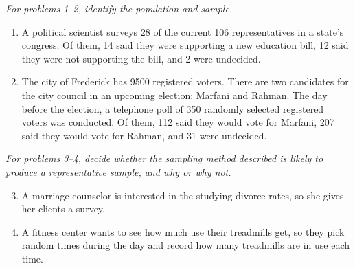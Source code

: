 \emph{For problems 1--2, identify the population and sample.}
\begin{enumerate}
\item A political scientist surveys 28 of the current 106 representatives in a state's congress. Of them, 14 said they were supporting a new education bill, 12 said they were not supporting the bill, and 2 were undecided. 

\item The city of Frederick has 9500 registered voters. There are two candidates for the city council in an upcoming election: Marfani and Rahman. The day before the election, a telephone poll of 350 randomly selected registered voters was conducted. Of them, 112 said they would vote for Marfani, 207 said they would vote for Rahman, and 31 were undecided. 
\end{enumerate} 

\emph{For problems 3--4, decide whether the sampling method described is likely to produce a representative sample, and why or why not.}
\begin{enumerate}
\setcounter{enumi}{2}
\item A marriage counselor is interested in the studying divorce rates, so she gives her clients a survey. 

\item A fitness center wants to see how much use their treadmills get, so they pick random times during the day and record how many treadmills are in use each time. 
\end{enumerate}

